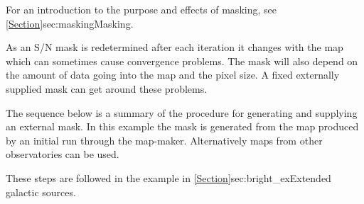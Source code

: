 For an introduction to the purpose and effects of masking, see
\cref{Section}{sec:masking}{Masking}.

As an S/N mask is redetermined after each iteration it changes with the map
 which can sometimes cause convergence problems. The mask
will also depend on the amount of data going into the map and the
pixel size. A fixed externally supplied mask  can get around these problems.

The sequence below is a summary of the procedure for generating and
supplying an external mask. In this example the mask is generated from
the map produced by an initial run through the map-maker.
Alternatively maps from other observatories can be used.

These steps are followed in the example in
\cref{Section}{sec:bright_ex}{Extended galactic sources}.

